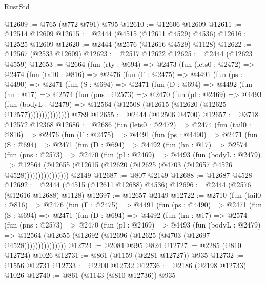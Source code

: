 \begin{lexlean}{RustStd}
\begin{coremodule}
@12609 := @765 (@772 @791) @795
@12610 := @12606 @12609
@12611 := @12514 @12609
@12615 := @2444 (@4515 (@12611 @4529) @4536)
@12616 := @12525 @12609
@12620 := @2444 (@2576 (@12616 @4529) @1128)
@12622 := @12567 (@2533 @12609)
@12623 := @2517 @12622
@12625 := @2444 (@12623 @4559)
@12653 := @2664
    (fun (rty : @694) =>
    @2473
      (fun (lets0 : @2472) =>
      @2474
        (fun (tail0 : @816) =>
        @2476
          (fun (Γ : @2475) =>
          @4491
            (fun (ps : @4490) =>
            @2471
              (fun (S : @694) =>
              @2471
                (fun (D : @694) =>
                @4492
                  (fun (hn : @17) =>
                  @2574
                    (fun (pns : @2573) =>
                    @2470
                      (fun (pl : @2469) =>
                      @4493
                        (fun (bodyL : @2479) =>
                        @12564 (@12508 (@12615 (@12620 (@12625 @12577)))))))))))))))
    @789
@12655 := @2444 (@12506 @4700)
@12657 := @3718 @12572 @12368
@12686 := @2686
    (fun (lets0 : @2472) =>
    @2474
      (fun (tail0 : @816) =>
      @2476
        (fun (Γ : @2475) =>
        @4491
          (fun (ps : @4490) =>
          @2471
            (fun (S : @694) =>
            @2471
              (fun (D : @694) =>
              @4492
                (fun (hn : @17) =>
                @2574
                  (fun (pns : @2573) =>
                  @2470
                    (fun (pl : @2469) =>
                    @4493
                      (fun (bodyL : @2479) =>
                      @12564
                        (@12655 (@12615 (@12620 (@12625 (@4703 (@12657 @4526 @4528))))))))))))))))
    @2149
@12687 := @807 @2149
@12688 := @12687 @4528
@12692 := @2444 (@4515 (@12611 @12688) @4536)
@12696 := @2444 (@2576 (@12616 @12688) @1128)
@12697 := @12657 @2149
@12722 := @2710
    (fun (tail0 : @816) =>
    @2476
      (fun (Γ : @2475) =>
      @4491
        (fun (ps : @4490) =>
        @2471
          (fun (S : @694) =>
          @2471
            (fun (D : @694) =>
            @4492
              (fun (hn : @17) =>
              @2574
                (fun (pns : @2573) =>
                @2470
                  (fun (pl : @2469) =>
                  @4493
                    (fun (bodyL : @2479) =>
                    @12564 (@12655 (@12692 (@12696 (@12625 (@4703 (@12697 @4528)))))))))))))))
@12724 := @2084 @995 @824
@12727 := @2285 (@810 @12724) @1026
@12731 := @861 (@1159 (@2281 @12727)) @935
@12732 := @1556 @12731
@12733 := @2200 @12732
@12736 := @2186 (@2198 @12733) @1026
@12740 := @861 (@1143 (@810 @12736)) @935

\end{coremodule}
\end{lexlean}
